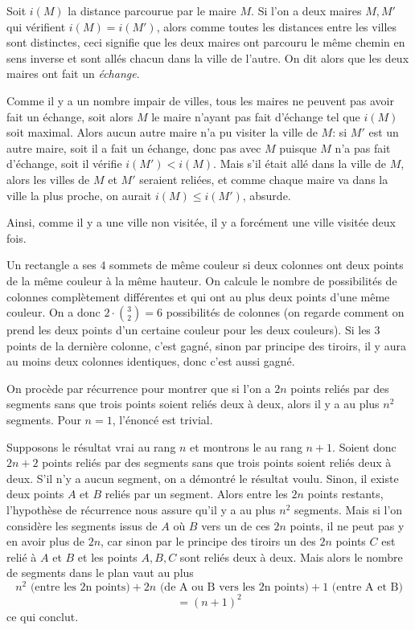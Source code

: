 \begin{sol}
Soit $i(M)$ la distance parcourue par le maire $M$. Si l'on a deux maires $M,M'$ qui vérifient $i(M)=i(M')$, alors comme toutes les distances entre les villes sont distinctes, ceci signifie que les deux maires ont parcouru le même chemin en sens inverse et sont allés chacun dans la ville de l'autre. On dit alors que les deux maires ont fait un \textit{échange}.

Comme il y a un nombre impair de villes, tous les maires ne peuvent pas avoir fait un échange, soit alors $M$ le maire n'ayant pas fait d'échange tel que $i(M)$ soit maximal. Alors aucun autre maire n'a pu visiter la ville de $M$: si $M'$ est un autre maire, soit il a fait un échange, donc pas avec $M$ puisque $M$ n'a pas fait d'échange, soit il vérifie $i(M')<i(M)$. Mais s'il était allé dans la ville de $M$, alors les villes de $M$ et $M'$ seraient reliées, et comme chaque maire va dans la ville la plus proche, on aurait $i(M)\le i(M')$, absurde.

Ainsi, comme il y a une ville non visitée, il y a forcément une ville visitée deux fois.
\end{sol}

\begin{sol}
Un rectangle a ses $4$ sommets de même couleur si deux colonnes ont deux points de la même couleur à la même hauteur. On calcule le nombre de possibilités de colonnes complètement différentes et qui ont au plus deux points d'une même couleur. On a donc $2 \cdot \binom{3}{2} = 6$ possibilités de colonnes (on regarde comment on prend les deux points d'un certaine couleur pour les deux couleurs). Si les $3$ points de la dernière colonne, c'est gagné, sinon par principe des tiroirs, il y aura au moins deux colonnes identiques, donc c'est aussi gagné.
\end{sol}

\begin{sol}
On procède par récurrence pour montrer que si l'on a $2n$ points reliés par des segments sans que trois points soient reliés deux à deux, alors il y a au plus $n^2$ segments. Pour $n=1$, l'énoncé est trivial.

Supposons le résultat vrai au rang $n$ et montrons le au rang $n+1$. Soient donc $2n+2$ points reliés par des segments sans que trois points soient reliés deux à deux. S'il n'y a aucun segment, on a démontré le résultat voulu. Sinon, il existe deux points $A$ et $B$ reliés par un segment. Alors entre les $2n$ points restants, l'hypothèse de récurrence nous assure qu'il y a au plus $n^2$ segments. Mais si l'on considère les segments issus de $A$ où $B$ vers un de ces $2n$ points, il ne peut pas y en avoir plus de $2n$, car sinon par le principe des tiroirs un des $2n$ points $C$ est relié à $A$ et $B$ et les points
$A,B,C$ sont reliés deux à deux. Mais alors le nombre de segments dans le plan vaut au plus
$$n^2\text{ (entre les 2n points)}+2n\text{ (de A ou B vers les 2n points)}+1\text{ (entre A et B)}$$
$$=(n+1)^2$$
ce qui conclut.
\end{sol}


